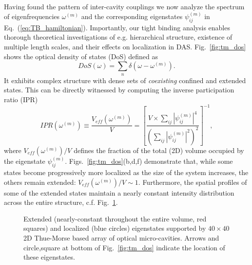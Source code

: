 Having found the pattern of inter-cavity couplings we now analyze the spectrum of eigenfrequencies $\omega^{(m)}$ and the corresponding eigenstates $\psi^{(m)}_{ij}$ in Eq.~(\ref{eq:TB_hamiltonian}). Importantly, our tight binding analysis enables thorough theoretical investigations of e.g. hierarchical structure, existence of multiple length scales, and their effects on localization in DAS. Fig.~\ref{fig:tm_dos} shows the optical density of states (DoS) defined as
\begin{equation}
DoS(\omega)=\sum_n\delta(\omega-\omega^{(m)}).
\label{eq:dos}
\end{equation}
It exhibits complex structure with dense sets of {\it coexisting} confined and extended states. This can be directly witnessed by computing the inverse participation ratio (IPR)
\begin{equation}
IPR(\omega^{(m)})\equiv\frac{V_{eff}(\omega^{(m)})}{V}=\left[\frac{V\times\sum_{ij}\left|\psi^{(m)}_{ij}\right|^4}{\left(\sum_{ij}\left|\psi^{(m)}_{ij}\right|^2\right)^2}\right]^{-1}, 
\label{eq:IPR}
\end{equation}
where $V_{eff}(\omega^{(m)})/V$ defines the fraction of the total (2D) volume occupied by the eigenstate $\psi^{(m)}_{ij}$. Figs.~\ref{fig:tm_dos}(b,d,f) demonstrate that, while some states become progressively more localized as the size of the system increases, the others remain extended: $V_{eff}(\omega^{(m)})/V\sim1$. Furthermore, the spatial profiles of some of the extended states maintain a nearly constant intensity distribution across the entire structure, c.f. Fig.~\ref{fig:state_profiles}. 

\begin{figure}%
\vskip -0.15in
\vskip -0.15in
\caption[Extended (nearly-constant throughout the entire volume, blue circles) and localized (red squares) eigenstates supported by $40\times 40$ 2D Thue-Morse based array of optical micro-cavities.]{\label{fig:state_profiles} %
Extended (nearly-constant throughout the entire volume, red squares) and localized (blue circles) eigenstates supported by $40\times 40$ 2D Thue-Morse based array of optical micro-cavities. Arrows and circle,square at bottom of Fig.~\ref{fig:tm_dos} indicate the location of these eigenstates.}
\end{figure}

